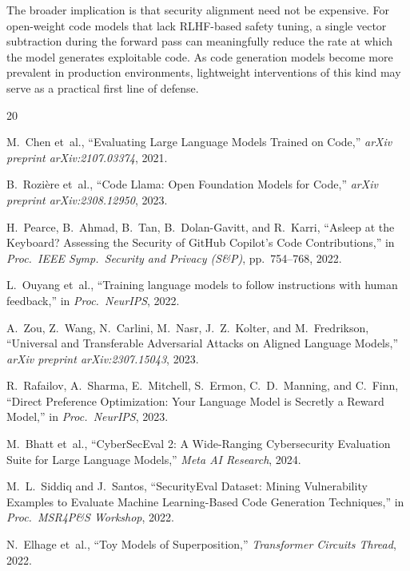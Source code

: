 \documentclass[journal, onecolumn]{IEEEtran}
\begin{document}
The broader implication is that security alignment need not be expensive. For open-weight code models that lack RLHF-based safety tuning, a single vector subtraction during the forward pass can meaningfully reduce the rate at which the model generates exploitable code. As code generation models become more prevalent in production environments, lightweight interventions of this kind may serve as a practical first line of defense.

\begin{thebibliography}{20}

M.~Chen et~al., ``Evaluating Large Language Models Trained on Code,'' \textit{arXiv preprint arXiv:2107.03374}, 2021.

B.~Rozi\`ere et~al., ``Code Llama: Open Foundation Models for Code,'' \textit{arXiv preprint arXiv:2308.12950}, 2023.

H.~Pearce, B.~Ahmad, B.~Tan, B.~Dolan-Gavitt, and R.~Karri, ``Asleep at the Keyboard? Assessing the Security of GitHub Copilot's Code Contributions,'' in \textit{Proc.\ IEEE Symp.\ Security and Privacy (S\&P)}, pp.~754--768, 2022.

L.~Ouyang et~al., ``Training language models to follow instructions with human feedback,'' in \textit{Proc.\ NeurIPS}, 2022.

A.~Zou, Z.~Wang, N.~Carlini, M.~Nasr, J.~Z.~Kolter, and M.~Fredrikson, ``Universal and Transferable Adversarial Attacks on Aligned Language Models,'' \textit{arXiv preprint arXiv:2307.15043}, 2023.

R.~Rafailov, A.~Sharma, E.~Mitchell, S.~Ermon, C.~D.~Manning, and C.~Finn, ``Direct Preference Optimization: Your Language Model is Secretly a Reward Model,'' in \textit{Proc.\ NeurIPS}, 2023.

M.~Bhatt et~al., ``CyberSecEval 2: A Wide-Ranging Cybersecurity Evaluation Suite for Large Language Models,'' \textit{Meta AI Research}, 2024.

M.~L.~Siddiq and J.~Santos, ``SecurityEval Dataset: Mining Vulnerability Examples to Evaluate Machine Learning-Based Code Generation Techniques,'' in \textit{Proc.\ MSR4P\&S Workshop}, 2022.

N.~Elhage et~al., ``Toy Models of Superposition,'' \textit{Transformer Circuits Thread}, 2022.


\end{thebibliography}
\end{document}
